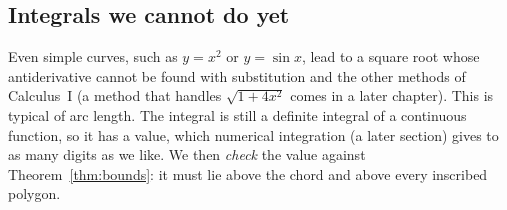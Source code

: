 \documentclass[11pt]{article}
\begin{document}
\subsection*{Integrals we cannot do yet}

Even simple curves, such as $y=x^2$ or $y=\sin x$, lead to a square root whose antiderivative cannot be found with substitution and the other methods of Calculus~I (a method that handles $\sqrt{1+4x^2}$ comes in a later chapter). This is typical of arc length. The integral is still a definite integral of a continuous function, so it has a value, which numerical integration (a later section) gives to as many digits as we like. We then \emph{check} the value against Theorem~\ref{thm:bounds}: it must lie above the chord and above every inscribed polygon.
\end{document}
